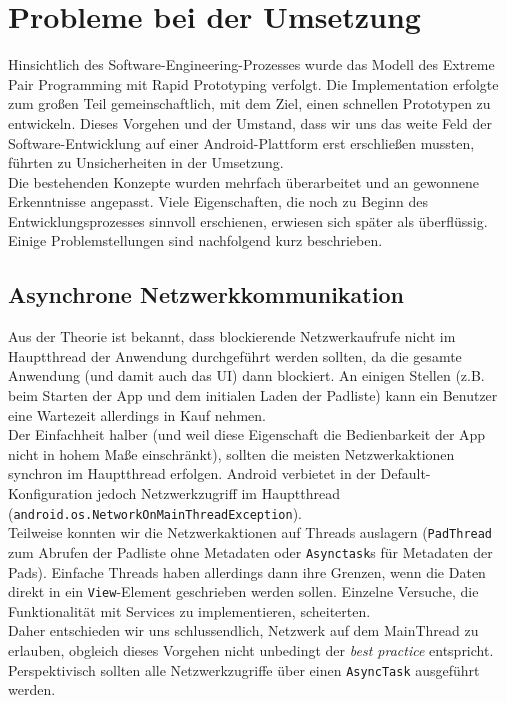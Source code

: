 \section{Probleme bei der Umsetzung}
Hinsichtlich des Software-Engineering-Prozesses wurde das Modell des Extreme Pair Programming mit Rapid Prototyping verfolgt.
Die Implementation erfolgte zum großen Teil gemeinschaftlich, mit dem Ziel, einen schnellen Prototypen zu entwickeln.
Dieses Vorgehen und der Umstand, dass wir uns das weite Feld der Software-Entwicklung auf einer Android-Plattform erst erschließen mussten, führten zu Unsicherheiten in der Umsetzung.\\
Die bestehenden Konzepte wurden mehrfach überarbeitet und an gewonnene Erkenntnisse angepasst.
Viele Eigenschaften, die noch zu Beginn des Entwicklungsprozesses sinnvoll erschienen, erwiesen sich später als überflüssig.\\
Einige Problemstellungen sind nachfolgend kurz beschrieben.

\subsection{Asynchrone Netzwerkkommunikation}
Aus der Theorie ist bekannt, dass blockierende Netzwerkaufrufe nicht im Hauptthread der Anwendung durchgeführt werden sollten, da die gesamte Anwendung (und damit auch das UI) dann blockiert.
An einigen Stellen (z.B. beim Starten der App und dem initialen Laden der Padliste) kann ein Benutzer eine Wartezeit allerdings in Kauf nehmen.\\
Der Einfachheit halber (und weil diese Eigenschaft die Bedienbarkeit der App nicht in hohem Maße einschränkt), sollten die meisten Netzwerkaktionen synchron im Hauptthread erfolgen.
Android verbietet in der Default-Konfiguration jedoch Netzwerkzugriff im Hauptthread (\texttt{android.os.NetworkOnMainThreadException}).\\
Teilweise konnten wir die Netzwerkaktionen auf Threads auslagern (\texttt{PadThread} zum Abrufen der Padliste ohne Metadaten oder \texttt{Asynctask}s für Metadaten der Pads).
Einfache Threads haben allerdings dann ihre Grenzen, wenn die Daten direkt in ein \texttt{View}-Element geschrieben werden sollen.
Einzelne Versuche, die Funktionalität mit Services zu implementieren, scheiterten.\\
Daher entschieden wir uns schlussendlich, Netzwerk auf dem MainThread zu erlauben, obgleich dieses Vorgehen nicht unbedingt der \textit{best practice} entspricht.
Perspektivisch sollten alle Netzwerkzugriffe über einen \texttt{AsyncTask} ausgeführt werden.

